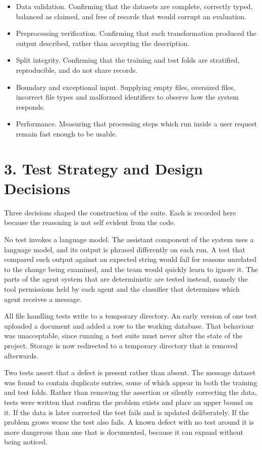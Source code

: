\documentclass[11pt,a4paper]{article}
\begin{document}
\begin{itemize}[leftmargin=*,itemsep=2pt]
  \item Data validation. Confirming that the datasets are complete, correctly typed, balanced as claimed, and free of records that would corrupt an evaluation.
  \item Preprocessing verification. Confirming that each transformation produced the output described, rather than accepting the description.
  \item Split integrity. Confirming that the training and test folds are stratified, reproducible, and do not share records.
  \item Boundary and exceptional input. Supplying empty files, oversized files, incorrect file types and malformed identifiers to observe how the system responds.
  \item Performance. Measuring that processing steps which run inside a user request remain fast enough to be usable.
\end{itemize}

\section{3. Test Strategy and Design Decisions}
Three decisions shaped the construction of the suite. Each is recorded here because the reasoning is not self evident from the code.

No test invokes a language model. The assistant component of the system uses a language model, and its output is phrased differently on each run. A test that compared such output against an expected string would fail for reasons unrelated to the change being examined, and the team would quickly learn to ignore it. The parts of the agent system that are deterministic are tested instead, namely the tool permissions held by each agent and the classifier that determines which agent receives a message.

All file handling tests write to a temporary directory. An early version of one test uploaded a document and added a row to the working database. That behaviour was unacceptable, since running a test suite must never alter the state of the project. Storage is now redirected to a temporary directory that is removed afterwards.

Two tests assert that a defect is present rather than absent. The message dataset was found to contain duplicate entries, some of which appear in both the training and test folds. Rather than removing the assertion or silently correcting the data, tests were written that confirm the problem exists and place an upper bound on it. If the data is later corrected the test fails and is updated deliberately. If the problem grows worse the test also fails. A known defect with no test around it is more dangerous than one that is documented, because it can expand without being noticed.
\end{document}
